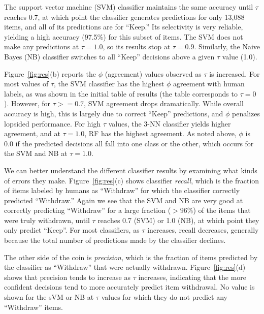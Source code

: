 \documentclass[man,11pt]{apa6}
\begin{document}
The support vector machine (SVM) classifier maintains the same
accuracy until $\tau$ reaches 0.7, at which point the classifier
generates predictions for only 13,088 items, and all of its predictions
are for ``Keep.''  Its selectivity is very reliable, yielding a high
accuracy (97.5\%) for this subset of items.  The SVM does not make any
predictions at $\tau=1.0$, so its results stop at $\tau=0.9$.
Similarly, the Naive Bayes (NB) classifier switches to all ``Keep''
decisions above a given $\tau$ value (1.0).

Figure~\ref{fig:res}(b) reports the $\phi$ (agreement) values observed
as $\tau$ is increased.  For most values of $\tau$, the SVM classifier
has the highest $\phi$ agreement with human labels, as was shown in
the initial table of results (the table corresponds to $\tau=0$).
However, for $\tau >= 0.7$, SVM agreement drops dramatically.  While
overall accuracy is high, this is largely due to correct ``Keep''
predictions, and $\phi$ penalizes lopsided performance.  For high
$\tau$ values, the 3-NN classifier yields higher agreement, and at
$\tau = 1.0$, RF has the highest agreement.  As noted above, $\phi$ is
$0.0$ if the predicted decisions all fall into one class or the other,
which occurs for the SVM and NB at $\tau=1.0$.

We can better understand the different classifier results by examining
what kinds of errors they make.  Figure~\ref{fig:res}(c) shows
classifier {\em recall}, which is the fraction of items labeled by
humans as ``Withdraw'' for which the classifier correctly predicted
``Withdraw.''  Again we see that the SVM and NB are very good at
correctly predicting ``Withdraw'' for a large fraction ($> 96$\%) of
the items that were truly withdrawn, until $\tau$ reaches 0.7 (SVM) or
1.0 (NB), at which point they only predict ``Keep''.  For most
classifiers, as $\tau$ increases, recall decreases, generally because
the total number of predictions made by the classifier declines.

The other side of the coin is {\em precision}, which is the fraction
of items predicted by the classifier as ``Withdraw'' that were
actually withdrawn.  Figure~\ref{fig:res}(d) shows that precision
tends to increase as $\tau$ increases, indicating that the more
confident decisions tend to more accurately predict item
withdrawal. No value is shown for the sVM or NB at $\tau$ values for
which they do not predict any ``Withdraw'' items.
\end{document}
